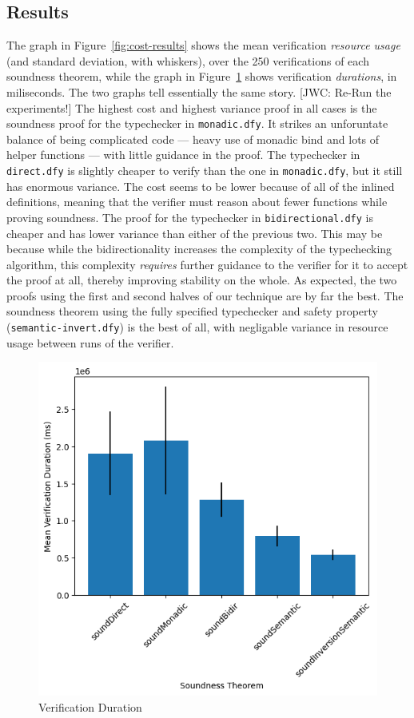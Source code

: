 \documentclass[sigplan,review,screen,anonymous]{acmart}
\newcommand{\comm}[3]{\textcolor{#1}{[#2: #3]}}
\newcommand{\jwc}[1]{\comm{dkgreen}{JWC}{#1}}
\begin{document}
\subsection*{Results}
The graph in Figure~\ref{fig:cost-results} shows the mean verification \emph{resource usage} (and standard deviation, with whiskers), over the 250 verifications of each soundness theorem,
while the graph in Figure~\ref{fig:dur-results} shows verification \emph{durations}, in miliseconds. The two graphs tell essentially the same story.
\jwc{Re-Run the experiments!}
The highest cost and highest variance proof in all cases is the soundness proof for the typechecker in \texttt{monadic.dfy}. It strikes an unforuntate balance of being complicated code --- heavy use of monadic bind and lots of helper functions --- with little guidance in the proof.
The typechecker in \texttt{direct.dfy} is slightly cheaper to verify than the one in \texttt{monadic.dfy}, but it still has enormous variance. The cost seems to be lower because of all of the inlined definitions,
meaning that the verifier must reason about fewer functions while proving soundness.
The proof for the typechecker in \texttt{bidirectional.dfy} is cheaper and has lower variance than either of the previous two. This may be because while the bidirectionality increases the complexity of the typechecking algorithm,
this complexity \emph{requires} further guidance to the verifier for it to accept the proof at all, thereby improving stability on the whole.
As expected, the two proofs using the first and second halves of our technique
are by far the best. The soundness theorem using the fully specified typechecker and safety property (\texttt{semantic-invert.dfy})
is the best of all, with negligable variance in resource usage between runs of the verifier.

\begin{figure}
  \includegraphics[scale=0.5]{durgraph.png}
  \caption{Verification Duration}
  \label{fig:dur-results}
\end{figure}
\end{document}
